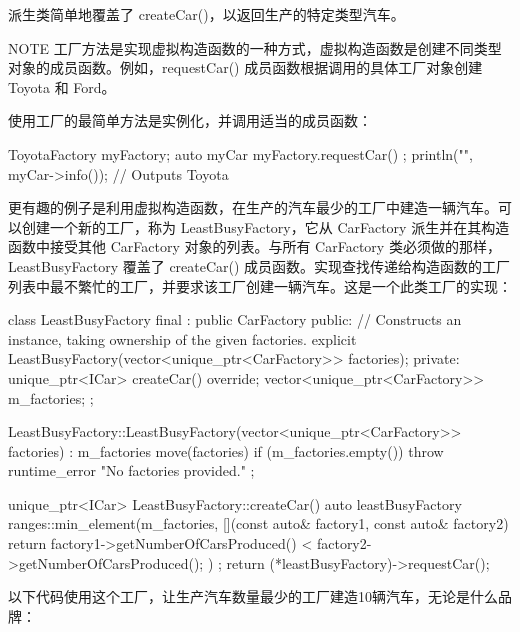 派生类简单地覆盖了 createCar()，以返回生产的特定类型汽车。

\begin{myNotic}{NOTE}
工厂方法是实现虚拟构造函数的一种方式，虚拟构造函数是创建不同类型对象的成员函数。例如，requestCar() 成员函数根据调用的具体工厂对象创建 Toyota 和 Ford。
\end{myNotic}


使用工厂的最简单方法是实例化，并调用适当的成员函数：

\begin{cpp}
ToyotaFactory myFactory;
auto myCar { myFactory.requestCar() };
println("{}", myCar->info()); // Outputs Toyota
\end{cpp}

更有趣的例子是利用虚拟构造函数，在生产的汽车最少的工厂中建造一辆汽车。可以创建一个新的工厂，称为 LeastBusyFactory，它从 CarFactory 派生并在其构造函数中接受其他 CarFactory 对象的列表。与所有 CarFactory 类必须做的那样，LeastBusyFactory 覆盖了 createCar() 成员函数。实现查找传递给构造函数的工厂列表中最不繁忙的工厂，并要求该工厂创建一辆汽车。这是一个此类工厂的实现：

\begin{cpp}
class LeastBusyFactory final : public CarFactory
{
    public:
        // Constructs an instance, taking ownership of the given factories.
        explicit LeastBusyFactory(vector<unique_ptr<CarFactory>> factories);
    private:
        unique_ptr<ICar> createCar() override;
        vector<unique_ptr<CarFactory>> m_factories;
};

LeastBusyFactory::LeastBusyFactory(vector<unique_ptr<CarFactory>> factories)
    : m_factories { move(factories) }
{
    if (m_factories.empty()) {
        throw runtime_error { "No factories provided." };
    }
}

unique_ptr<ICar> LeastBusyFactory::createCar()
{
    auto leastBusyFactory { ranges::min_element(m_factories,
        [](const auto& factory1, const auto& factory2) {
            return factory1->getNumberOfCarsProduced() <
                factory2->getNumberOfCarsProduced(); }) };
    return (*leastBusyFactory)->requestCar();
}
\end{cpp}

以下代码使用这个工厂，让生产汽车数量最少的工厂建造10辆汽车，无论是什么品牌：

